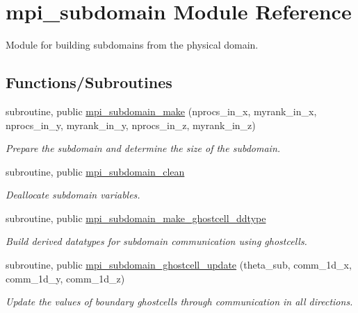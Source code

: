 \hypertarget{namespacempi__subdomain}{}\section{mpi\+\_\+subdomain Module Reference}
\label{namespacempi__subdomain}


Module for building subdomains from the physical domain.  


\subsection*{Functions/\+Subroutines}
\begin{DoxyCompactItemize}
\item 
subroutine, public \hyperlink{namespacempi__subdomain_a3a1e7cf64aafbebd3c09b92fc56bd311}{mpi\+\_\+subdomain\+\_\+make} (nprocs\+\_\+in\+\_\+x, myrank\+\_\+in\+\_\+x, nprocs\+\_\+in\+\_\+y, myrank\+\_\+in\+\_\+y, nprocs\+\_\+in\+\_\+z, myrank\+\_\+in\+\_\+z)
\begin{DoxyCompactList}\small\item\em Prepare the subdomain and determine the size of the subdomain. \end{DoxyCompactList}\item 
subroutine, public \hyperlink{namespacempi__subdomain_a56e9f2afd59e45fcada0f1c21a90eefe}{mpi\+\_\+subdomain\+\_\+clean}
\begin{DoxyCompactList}\small\item\em Deallocate subdomain variables. \end{DoxyCompactList}\item 
subroutine, public \hyperlink{namespacempi__subdomain_ad788c273d92ea7058caf0874bffdad6d}{mpi\+\_\+subdomain\+\_\+make\+\_\+ghostcell\+\_\+ddtype}
\begin{DoxyCompactList}\small\item\em Build derived datatypes for subdomain communication using ghostcells. \end{DoxyCompactList}\item 
subroutine, public \hyperlink{namespacempi__subdomain_a2e34a77537009dd448375e8fdc8d5b62}{mpi\+\_\+subdomain\+\_\+ghostcell\+\_\+update} (theta\+\_\+sub, comm\+\_\+1d\+\_\+x, comm\+\_\+1d\+\_\+y, comm\+\_\+1d\+\_\+z)
\begin{DoxyCompactList}\small\item\em Update the values of boundary ghostcells through communication in all directions. \end{DoxyCompactList}\item 

\end{DoxyCompactItemize}
